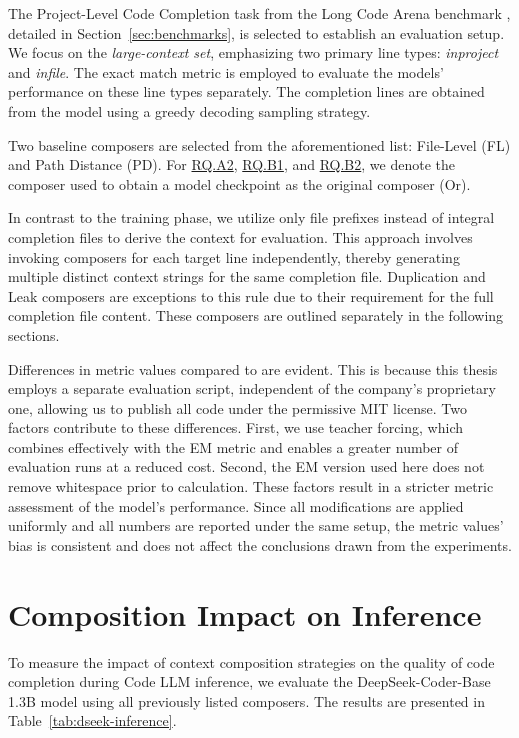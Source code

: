 The Project-Level Code Completion task from the Long Code Arena benchmark \parencite{bogomolov2024}, detailed in Section~\ref{sec:benchmarks}, is selected to establish an evaluation setup. We focus on the \textit{large-context set}, emphasizing two primary line types: \textit{inproject} and \textit{infile}. The exact match metric is employed to evaluate the models' performance on these line types separately. The completion lines are obtained from the model using a greedy decoding sampling strategy.

Two baseline composers are selected from the aforementioned list: File-Level (FL) and Path Distance (PD). For \hyperref[rq:rq-a2]{RQ.A2}, \hyperref[rq:rq-b1]{RQ.B1}, and \hyperref[rq:rq-b2]{RQ.B2}, we denote the composer used to obtain a model checkpoint as the original composer (Or).

In contrast to the training phase, we utilize only file prefixes instead of integral completion files to derive the context for evaluation. This approach involves invoking composers for each target line independently, thereby generating multiple distinct context strings for the same completion file. Duplication and Leak composers are exceptions to this rule due to their requirement for the full completion file content. These composers are outlined separately in the following sections.

Differences in metric values compared to \citet{sapronov2025} are evident. This is because this thesis employs a separate evaluation script, independent of the company's proprietary one, allowing us to publish all code under the permissive MIT license. Two factors contribute to these differences. First, we use teacher forcing, which combines effectively with the EM metric and enables a greater number of evaluation runs at a reduced cost. Second, the EM version used here does not remove whitespace prior to calculation. These factors result in a stricter metric assessment of the model's performance. Since all modifications are applied uniformly and all numbers are reported under the same setup, the metric values' bias is consistent and does not affect the conclusions drawn from the experiments.

\section{Composition Impact on Inference}\label{sec:composition-impact-on-inference}

To measure the impact of context composition strategies on the quality of code completion during Code LLM inference, we evaluate the DeepSeek-Coder-Base 1.3B model \parencite{guo2024} using all previously listed composers. The results are presented in Table~\ref{tab:dseek-inference}.


